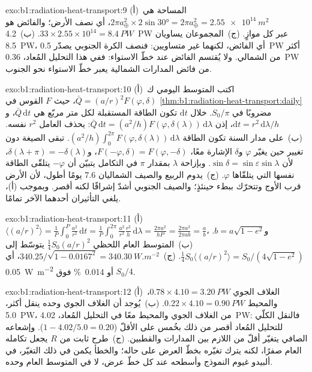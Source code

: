 \begin{solution}{exo:b1:radiation-heat-transport:9}
(أ)~المساحة هي $2\pi a_\oplus^2 \times 2\sin\ang{30} = 2\pi a_\oplus^2 =
\qty{2.55e14}{m^2}$، أي نصف الأرض؛ والفائض هو $33 \times 2.55\times10^{14} =
\qty{8.4}{PW}$. (ب)~\qty{4.2}{PW} عبر كل موازٍ. (ج)~المجموعان يساويان
\qty{8.5}{PW}، أي الفائض، لكنهما غير متساويين: فنصف الكرة الجنوبي يصدّر \qty{0.5}{PW} أكثر من الشمالي. ولا يُقتسم الفائض عند خطّ الاستواء: ففي هذا التحليل المُعاد، \qty{0.36}{PW} من فائض المدارات الشمالية يعبر خطّ الاستواء نحو الجنوب.
\end{solution}

\begin{solution}{exo:b1:radiation-heat-transport:10}
(أ)~اكتب المتوسط اليومي ك$\bar Q = (a/r)^2 F(\varphi, \delta)$، حيث $F$ القوس في \cref{thm:b1:radiation-heat-transport:daily} مضروبًا في $S_0/\pi$. خلال $\mathrm dt$ تكون الطاقة المستقبلة لكل متر مربّع هي $\bar Q\,\mathrm dt$، و$\mathrm dt = r^2\,\mathrm d\lambda/h$، إذن $\bar Q\,\mathrm dt = (a^2/h)
F(\varphi, \delta(\lambda))\,\mathrm d\lambda$: يحذف العامل $r^2$ نفسه. (ب)~على مدار السنة تكون الطاقة $(a^2/h)\int_0^{2\pi} F(\varphi,
\delta(\lambda))\,\mathrm d\lambda$. تبقى الصيغة دون تغيير حين يغيّر $\varphi$ و$\delta$ الإشارة معًا، $F(-\varphi, \delta) = F(\varphi, -\delta)$، و$\delta(\lambda + \pi) = -\delta(\lambda)$، لأن $\sin\delta = \sin\varepsilon
\sin\lambda$. وبإزاحة $\lambda$ بمقدار $\pi$ في التكامل يتبيّن أن $-\varphi$ يتلقّى الطاقة نفسها التي يتلقّاها $\varphi$. (ج)~يدوم الربيع والصيف الشماليان \num{7.6} يومًا أطول، لأن الأرض قرب الأوج وتتحرّك ببطء حينئذٍ؛ والصيف الجنوبي أشدّ إشراقًا لكنه أقصر. وبموجب (أ)، يلغي التأثيران أحدهما الآخر تمامًا.
\end{solution}

\begin{solution}{exo:b1:radiation-heat-transport:11}
(أ)~$\langle (a/r)^2\rangle = \frac1P\int_0^P \frac{a^2}{r^2}\,\mathrm dt =
\frac1P\int_0^{2\pi}\frac{a^2}{r^2}\frac{r^2}{h}\,\mathrm d\lambda = \frac{2\pi
a^2}{hP} = \frac{2\pi a^2}{2\pi a b} = \frac ab$، و$b = a\sqrt{1-e^2}$.
(ب)~المتوسط العام اللحظي $\frac14 S_0(a/r)^2$ يتوسّط إلى $\frac14 S_0
\langle(a/r)^2\rangle = S_0/(4\sqrt{1-e^2})$. (ج)~$340.25/\sqrt{1 - 0.0167^2} =
\qty{340.30}{W.m^{-2}}$، أي \qty{0.05}{W.m^{-2}} أو \qty{0.014}{\percent} فوق
$S_0/4$.
\end{solution}

\begin{solution}{exo:b1:radiation-heat-transport:12}
(أ)~الغلاف الجوي $0.78 \times 4.10 = \qty{3.20}{PW}$، والمحيط $0.22 \times 4.10 =
\qty{0.90}{PW}$. (ب)~يُوجد أن الغلاف الجوي وحده ينقل أكثر، \qty{5.0}{PW}، من الغلاف الجوي والمحيط معًا في التحليل المُعاد، \qty{4.02}{PW}: فالنقل الكلّي للتحليل المُعاد أقصر من ذلك بخُمس على الأقلّ ($1 - 4.02/5.0 = 0.20$). وإشعاعه الصافي يتغيّر أقلّ من اللازم بين المدارات والقطبين. (ج)~طرح ثابت من $R$ يجعل تكامله العام صفرًا، لكنه يترك تغيّره بخطّ العرض على حاله؛ والخطأ يكمن في ذلك التغيّر، في ألبيدو غيوم النموذج وأسطحه عند كل خطّ عرض، لا في المتوسط العام وحده.
\end{solution}

